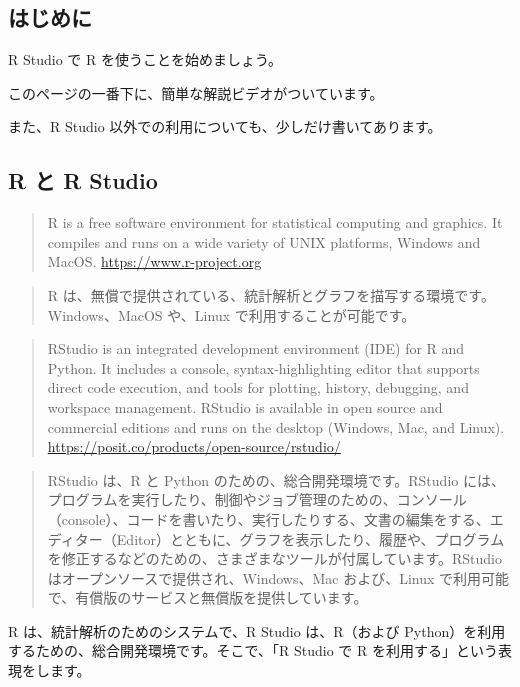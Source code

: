 \documentclass[
]{bxjsbook}
\theoremstyle{definition}
\theoremstyle{definition}
\theoremstyle{definition}
\theoremstyle{definition}
\theoremstyle{remark}
\begin{document}
\hypertarget{ux306fux3058ux3081ux306b}{%
\subsection{はじめに}\label{ux306fux3058ux3081ux306b}}

R Studio で R を使うことを始めましょう。

このページの一番下に、簡単な解説ビデオがついています。

また、R Studio 以外での利用についても、少しだけ書いてあります。

\hypertarget{r-ux3068-r-studio}{%
\subsection{R と R Studio}\label{r-ux3068-r-studio}}

\begin{quote}
R is a free software environment for statistical computing and graphics. It compiles and runs on a wide variety of UNIX platforms, Windows and MacOS. \url{https://www.r-project.org}
\end{quote}

\begin{quote}
R は、無償で提供されている、統計解析とグラフを描写する環境です。Windows、MacOS や、Linux で利用することが可能です。
\end{quote}

\begin{quote}
RStudio is an integrated development environment (IDE) for R and Python. It includes a console, syntax-highlighting editor that supports direct code execution, and tools for plotting, history, debugging, and workspace management. RStudio is available in open source and commercial editions and runs on the desktop (Windows, Mac, and Linux).　\url{https://posit.co/products/open-source/rstudio/}
\end{quote}

\begin{quote}
RStudio は、R と Python のための、総合開発環境です。RStudio には、プログラムを実行したり、制御やジョブ管理のための、コンソール（console）、コードを書いたり、実行したりする、文書の編集をする、エディター（Editor）とともに、グラフを表示したり、履歴や、プログラムを修正するなどのための、さまざまなツールが付属しています。RStudio はオープンソースで提供され、Windows、Mac および、Linux で利用可能で、有償版のサービスと無償版を提供しています。
\end{quote}

R は、統計解析のためのシステムで、R Studio は、R（および Python）を利用するための、総合開発環境です。そこで、「R Studio で R を利用する」という表現をします。
\end{document}
